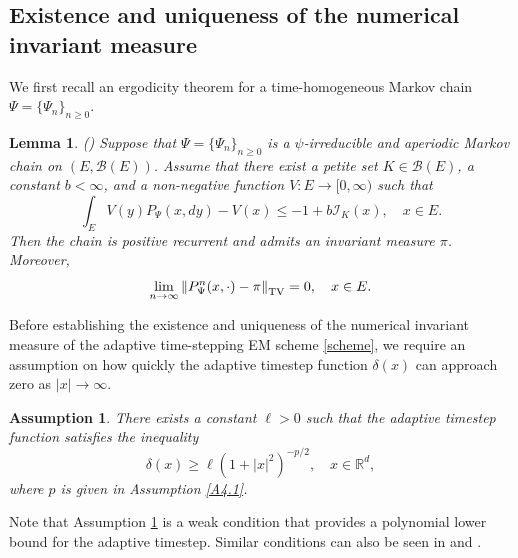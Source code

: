 \documentclass[preprint,12pt,compress]{elsarticle}
\newtheorem{lemma}[theorem]{Lemma}%
\newtheorem{assumption}[theorem]{Assumption}
\begin{document}
\subsection{Existence and uniqueness of the numerical invariant measure}

We first recall an ergodicity theorem for a time-homogeneous Markov chain $\Psi  = {\{ {\Psi _n}\} _{n \ge 0}}$.

\begin{lemma} \label{meyn14} (\cite[Theorem 14.0.1]{meyn2009markov})
Suppose that $\Psi  = {\{ {\Psi _n}\} _{n \ge 0}}$ is a $\psi$-irreducible and aperiodic Markov chain on $(E, \mathcal{B}(E))$. Assume that there exist a petite set $K \in \mathcal{B}(E)$, a constant $b < \infty$, and a non-negative function $V:E \to [0, \infty)$ such that
\begin{equation*}  
	\int_E {V(y){{P}_\Psi }(x,dy)} -V(x) \le -1 + b{\mathcal{I}_K}(x), \quad x \in E.
\end{equation*}
Then the chain is positive recurrent and admits an invariant measure $\pi$. Moreover,
\begin{equation*}
	\mathop {\lim }\limits_{n \to \infty }  {\left\| {{P_\Psi^n}(x, \cdot ) - \pi} \right\|_{{\rm TV}}} = 0, \quad  x\in E.
\end{equation*}

\end{lemma}


Before establishing the existence and uniqueness of the numerical invariant measure of the adaptive time-stepping EM scheme \eqref{scheme}, we require an assumption on how quickly the adaptive timestep function $\delta(x)$ can approach zero as $|x| \to \infty$.

\begin{assumption}  \label{A-step}
There exists a constant $\ell > 0$ such that the adaptive timestep function satisfies the inequality
\begin{equation*}
	\delta (x) \ge \ell {\left( {1 + {{\left| x \right|}^2}} \right)^{ - p/2}}, \quad x \in \mathbb{R}^d,
\end{equation*}
where $p$ is given in Assumption \ref{A4.1}.
\end{assumption}

Note that Assumption \ref{A-step} is a weak condition that provides a polynomial lower bound for the adaptive timestep. Similar conditions can also be seen in \cite[Theorem 11]{lemaire2007an} and \cite[Assumption 5]{fang2020adaptive}.
\end{document}
